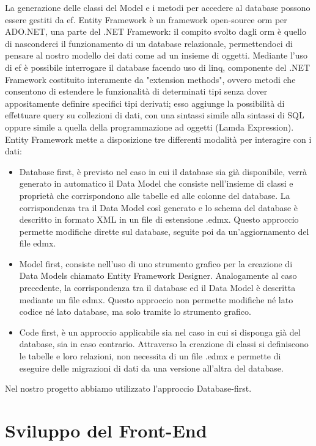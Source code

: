 La generazione delle classi del Model e i metodi per accedere al database possono essere gestiti da \Gls{ef}.
Entity Framework è un framework open-source \Gls{orm} per ADO.NET, una parte del .NET Framework: il compito svolto dagli \Gls{orm} è quello di nasconderci il funzionamento di un database relazionale, permettendoci di pensare al nostro modello dei dati come ad un insieme di oggetti.
Mediante l'uso di \Gls{ef} è possibile interrogare il database facendo uso di \Gls{linq}, componente del .NET Framework costituito interamente da "extension methods", ovvero metodi che consentono di estendere le funzionalità di determinati tipi senza dover appositamente definire specifici tipi derivati; esso aggiunge la possibilità di effettuare query su collezioni di dati, con una sintassi simile alla sintassi di SQL oppure simile a quella della programmazione ad oggetti (Lamda Expression).
Entity Framework mette a disposizione tre differenti modalità per interagire con i dati:
\begin{itemize}
    \item Database first, è previsto nel caso in cui il database sia già disponibile, verrà generato in automatico il Data Model che consiste nell'insieme di classi e proprietà che corrispondono alle tabelle ed alle colonne del database. La corrispondenza tra il Data Model così generato e lo schema del database è descritto in formato XML in un file di estensione .edmx. Questo approccio permette modifiche dirette sul database, seguite poi da un'aggiornamento del file edmx.
    \item Model first, consiste nell'uso di uno strumento grafico per la creazione di Data Models chiamato Entity Framework Designer. Analogamente al caso precedente, la corrispondenza tra il database ed il Data Model è descritta mediante un file edmx. Questo approccio non permette modifiche né lato codice né lato database, ma solo tramite lo strumento grafico.
    \item Code first, è un approccio applicabile sia nel caso in cui si disponga già del database, sia in caso contrario. Attraverso la creazione di classi si definiscono le tabelle e loro relazioni, non necessita di un file .edmx e permette di eseguire delle migrazioni di dati da una versione all'altra del database.
\end{itemize}
Nel nostro progetto abbiamo utilizzato l'approccio Database-first.



\newpage

\section{Sviluppo del Front-End}

